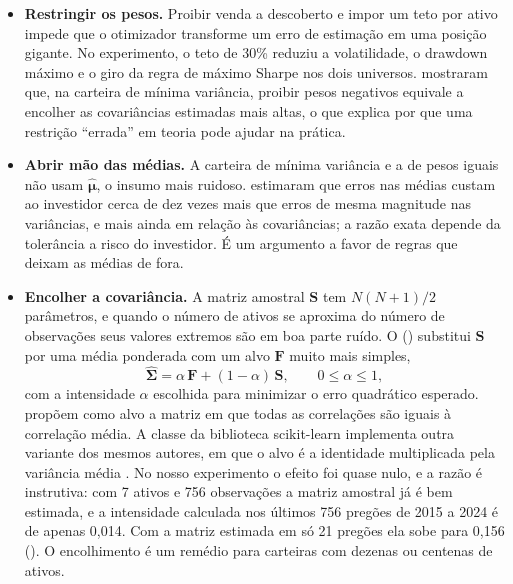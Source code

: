 \begin{itemize}[itemsep=4pt]
  \item \textbf{Restringir os pesos.} Proibir venda a descoberto e impor um teto por ativo impede que o otimizador transforme um erro de estimação em uma posição gigante. No experimento, o teto de 30\% reduziu a volatilidade, o drawdown máximo e o giro da regra de máximo Sharpe nos dois universos. \citet{jagannathan2003} mostraram que, na carteira de mínima variância, proibir pesos negativos equivale a encolher as covariâncias estimadas mais altas, o que explica por que uma restrição ``errada'' em teoria pode ajudar na prática.

  \item \textbf{Abrir mão das médias.} A carteira de mínima variância e a de pesos iguais não usam $\hat{\symbf{\mu}}$, o insumo mais ruidoso. \citet{chopra1993} estimaram que erros nas médias custam ao investidor cerca de dez vezes mais que erros de mesma magnitude nas variâncias, e mais ainda em relação às covariâncias; a razão exata depende da tolerância a risco do investidor. É um argumento a favor de regras que deixam as médias de fora.

  \item \textbf{Encolher a covariância.} A matriz amostral $\symbf{S}$ tem $N(N+1)/2$ parâmetros, e quando o número de ativos se aproxima do número de observações seus valores extremos são em boa parte ruído. O  () substitui $\symbf{S}$ por uma média ponderada com um alvo $\symbf{F}$ muito mais simples,
\begin{equation}
  \hat{\symbf{\Sigma}} = \alpha\,\symbf{F} + (1-\alpha)\,\symbf{S}, \qquad 0 \le \alpha \le 1 ,
  \label{eq:c08-shrink}
\end{equation}
com a intensidade $\alpha$ escolhida para minimizar o erro quadrático esperado. \citet{ledoit2004} propõem como alvo a matriz em que todas as correlações são iguais à correlação média. A classe  da biblioteca scikit-learn implementa outra variante dos mesmos autores, em que o alvo é a identidade multiplicada pela variância média \citep{ledoit2004b}. No nosso experimento o efeito foi quase nulo, e a razão é instrutiva: com 7 ativos e 756 observações a matriz amostral já é bem estimada, e a intensidade calculada nos últimos 756 pregões de 2015 a 2024 é de apenas 0,014. Com a matriz estimada em só 21 pregões ela sobe para 0,156 (). O encolhimento é um remédio para carteiras com dezenas ou centenas de ativos.


\end{itemize}
